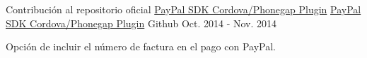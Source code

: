 \begin{cventries}
  \cventry
    {Contribución al repositorio oficial \href{https://github.com/paypal/PayPal-Cordova-Plugin}{PayPal SDK Cordova/Phonegap Plugin}} %
    {\faPaypal \hphantom{-} \href{https://github.com/zp1ke/PayPal-Cordova-Plugin}{PayPal SDK Cordova/Phonegap Plugin}} %
    {\faGithubSquare\acvHeaderIconSep Github} %
    {Oct. 2014 - Nov. 2014} %
    {
      \begin{cvitems} %
        \item {Opción de incluir el número de factura en el pago con PayPal.}
      \end{cvitems}
    }

\end{cventries}
